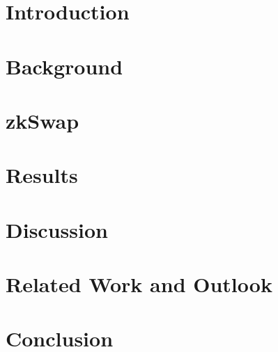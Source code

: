 \documentclass[11pt,a4paper,final]{article}
\begin{document}
    \tableofcontents
    \listoffigures
    \section{Introduction}
    

    \section{Background}
    

    \section{zkSwap}
    

    \section{Results}
    

    \section{Discussion}
    

    \section{Related Work and Outlook} \label{outlook}
    

    \section{Conclusion}
    

    
    
\end{document}
